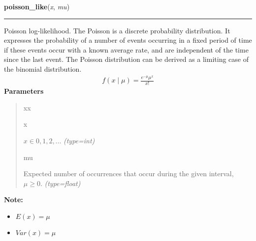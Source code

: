 \hspace{.8\funcindent}\begin{boxedminipage}{\funcwidth}

    \raggedright \textbf{poisson\_like}(\textit{x}, \textit{mu})

    \vspace{-1.5ex}

    \rule{\textwidth}{0.5\fboxrule}
\setlength{\parskip}{2ex}

Poisson log-likelihood. The Poisson is a discrete probability distribution.
It expresses the probability of a number of events occurring in a fixed
period of time if these events occur with a known average rate, and are
independent of the time since the last event. The Poisson distribution can
be derived as a limiting case of the binomial distribution.
\begin{equation*}\begin{split}f(x \mid \mu) = \frac{e^{-\mu}\mu^x}{x!}\end{split}\end{equation*}\setlength{\parskip}{1ex}
      \textbf{Parameters}
      \vspace{-1ex}

      \begin{quote}
        \begin{Ventry}{xx}

          \item[x]


$x \in {0,1,2,...}$
            {\it (type=int)}

          \item[mu]


Expected number of occurrences that occur during the given interval,
$\mu \geq 0$.
            {\it (type=float)}

        \end{Ventry}

      \end{quote}

\textbf{Note:} \begin{itemize}
\item {} 
$E(x)=\mu$

\item {} 
$Var(x)=\mu$

\end{itemize}


    \end{boxedminipage}

    \label{pymc:distributions:skew_normal_like}

